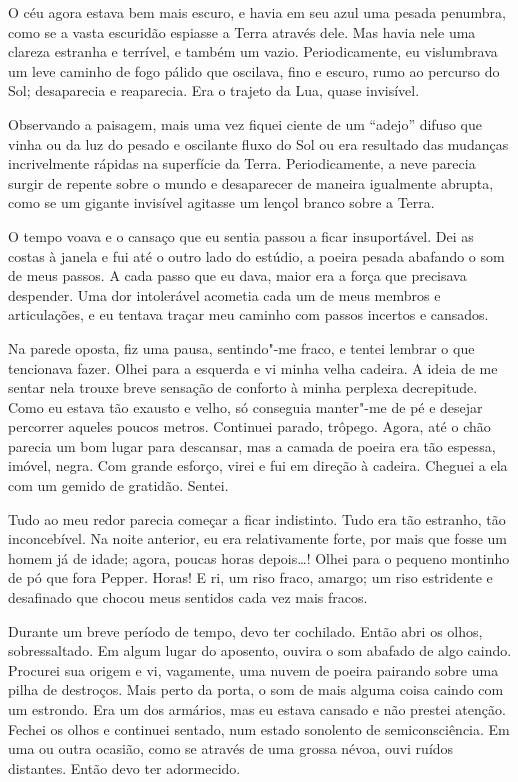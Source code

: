 O céu agora estava bem mais escuro, e havia em seu azul uma pesada penumbra, como se a vasta escuridão espiasse a Terra
através dele. Mas havia nele uma clareza estranha e terrível, e também um vazio. Periodicamente, eu vislumbrava um leve
caminho de fogo pálido que oscilava, fino e escuro, rumo ao percurso do Sol; desaparecia e reaparecia. Era o trajeto da
Lua, quase invisível.

Observando a paisagem, mais uma vez fiquei ciente de um ``adejo'' difuso que vinha ou da luz do pesado e oscilante fluxo do
Sol ou era resultado das mudanças incrivelmente rápidas na superfície da Terra. Periodicamente, a neve parecia
surgir de repente sobre o mundo e desaparecer de maneira igualmente abrupta, como se um gigante invisível agitasse
um lençol branco sobre a Terra.

O tempo voava e o cansaço que eu sentia passou a ficar insuportável. Dei as costas à janela e fui até o outro lado do
estúdio, a poeira pesada abafando o som de meus passos. A cada passo que eu dava, maior era a força que precisava
despender. Uma dor intolerável acometia cada um de meus membros e articulações, e eu tentava traçar meu caminho com
passos incertos e cansados.

Na parede oposta, fiz uma pausa, sentindo"-me fraco, e tentei lembrar o que tencionava fazer. Olhei para a
esquerda e vi minha velha cadeira. A ideia de me sentar nela trouxe breve sensação de conforto à minha perplexa
decrepitude. Como eu estava tão exausto e velho, só conseguia manter"-me de pé e desejar percorrer aqueles poucos
metros. Continuei parado, trôpego. Agora, até o chão parecia um bom lugar para descansar, mas a camada de poeira era
tão espessa, imóvel, negra. Com grande esforço, virei e fui em direção à cadeira. Cheguei a ela com um gemido de
gratidão. Sentei.

Tudo ao meu redor parecia começar a ficar indistinto. Tudo era tão estranho, tão inconcebível. Na noite anterior, eu era
relativamente forte, por mais que fosse um homem já de idade; agora, poucas horas depois\ldots{}! Olhei para o pequeno
montinho de pó que fora Pepper. Horas! E ri, um riso fraco, amargo; um riso estridente e desafinado que chocou meus
sentidos cada vez mais fracos.

Durante um breve período de tempo, devo ter cochilado. Então abri os olhos, sobressaltado. Em algum lugar do
aposento, ouvira o som abafado de algo caindo. Procurei sua origem e vi, vagamente, uma nuvem de poeira pairando sobre
uma pilha de destroços. Mais perto da porta, o som de mais alguma coisa caindo com um estrondo. Era um dos armários,
mas eu estava cansado e não prestei atenção. Fechei os olhos e continuei sentado, num estado sonolento de
semiconsciência. Em uma ou outra ocasião, como se através de uma grossa névoa, ouvi ruídos distantes. Então devo ter
adormecido.


